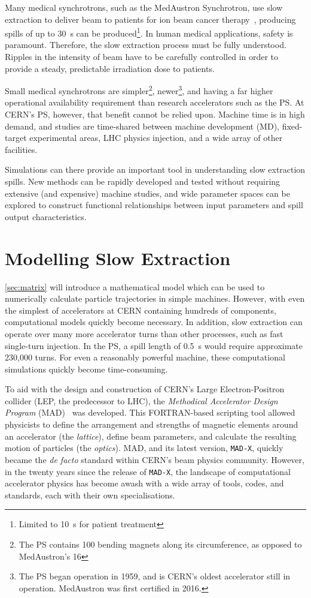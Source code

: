 \documentclass[11pt]{report}
\begin{document}
Many medical synchrotrons, such as the MedAustron Synchrotron, use slow extraction to deliver beam to patients for ion beam cancer therapy~\cite{ArrutiaSota:2845862}, producing spills of up to \qty{30}{\second} can be produced\footnote{Limited to \qty{10}{\second} for patient treatment}. In human medical applications, safety is paramount. Therefore, the slow extraction process must be fully understood. Ripples in the intensity of beam have to be carefully controlled in order to provide a steady, predictable irradiation dose to patients.

Small medical synchrotrons are simpler\footnote{The PS contains 100 bending magnets along its circumference, as opposed to MedAustron's 16}, newer\footnote{The PS began operation in 1959, and is CERN's oldest accelerator still in operation. MedAustron was first certified in 2016.}, and having a far higher operational availability requirement than research accelerators such as the PS. At CERN's PS, however, that benefit cannot be relied upon. Machine time is in high demand, and studies are time-shared between machine development (MD), fixed-target experimental areas, LHC physics injection, and a wide array of other facilities. 

Simulations can there provide an important tool in understanding slow extraction spills. New methods can be rapidly developed and tested without requiring extensive (and expensive) machine studies, and wide parameter spaces can be explored to construct functional relationships between input parameters and spill output characteristics. 

\section{Modelling Slow Extraction}

\autoref{sec:matrix} will introduce a mathematical model which can be used to numerically calculate particle trajectories in simple machines. However, with even the simplest of accelerators at CERN containing hundreds of components, computational models quickly become necessary. In addition, slow extraction can operate over many more accelerator turns than other processes, such as fast single-turn injection. In the PS, a spill length of \qty{0.5}{\second} would require approximate 230,000 turns. For even a reasonably powerful machine, these computational simulations quickly become time-consuming. 

To aid with the design and construction of CERN's Large Electron-Positron collider (LEP, the predecessor to LHC), the \textit{Methodical Accelerator Design Program} (MAD)~\cite{Iselin:MAD} was developed. This FORTRAN-based scripting tool allowed physicists to define the arrangement and strengths of magnetic elements around an accelerator (the \textit{lattice}), define beam parameters, and calculate the resulting motion of particles (the \textit{optics}). MAD, and its latest version, \verb|MAD-X|, quickly became the \textit{de facto} standard within CERN's beam physics community. However, in the twenty years since the release of \verb|MAD-X|, the landscape of computational accelerator physics has become awash with a wide array of tools, codes, and standards, each with their own specialisations. 
\end{document}
